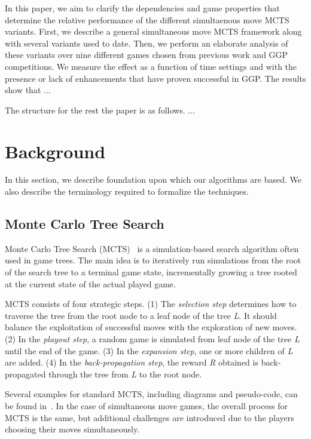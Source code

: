 \documentclass[conference]{IEEEtran}
\begin{document}
In this paper, we aim to clarify the dependencies and game properties that determine the relative performance of the different 
simultaenous move MCTS variants. First, we describe a general simultaneous move MCTS framework along with several variants
used to date. Then, we perform an 
elaborate analysis of these variants over nine different games chosen from previous work and GGP competitions. We measure 
the effect as a function of time settings and with the presence or lack of enhancements that have proven successful in GGP. 
The results show that ...

The structure for the rest the paper is as follows. ...

\section{Background}
\label{sec:background}

In this section, we describe foundation upon which our algorithms are based. 
We also describe the terminology required to formalize the techniques. 

\subsection{Monte Carlo Tree Search}

Monte Carlo Tree Search (MCTS)~\cite{Coulom06Efficient,Kocsis06Bandit} is a simulation-based search algorithm often 
used in game trees. The main idea is to iteratively run simulations from the root of the search tree to a terminal 
game state, incrementally growing a tree rooted at the current state of the actual played game. 

MCTS consists of four strategic steps. (1) The \textit{selection step} determines how to traverse the tree from the 
root node to a leaf node of the tree \textit{L}. It should balance the exploitation of successful moves with the 
exploration of new moves. (2) In the \textit{playout step}, a random game is simulated from leaf node of the tree 
\textit{L} until the end of the game.  (3) In the \textit{expansion step}, one or more children of \textit{L} are 
added. (4) In the \textit{back-propagation step}, the reward \textit{R} obtained is back-propagated through the tree 
from \textit{L} to the root node.

Several examples for standard MCTS, including diagrams and pseudo-code, can be found in~\cite{Browne12MCTSSurvey}.
In the case of simultaneous move games, the overall process for MCTS is the same, but additional challenges are 
introduced due to the players choosing their moves simultaneously.
\end{document}
